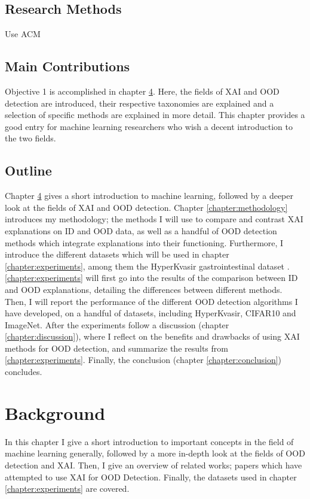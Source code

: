 \documentclass[UKenglish]{uiomasterthesis} %
\theoremstyle{definition}
\begin{document}
\section{Research Methods}

Use ACM


\section{Main Contributions}

Objective 1 is accomplished in chapter \ref{chapter:background}. Here, the fields of XAI and OOD detection are introduced, their respective taxonomies are explained and a selection of specific methods are explained in more detail. This chapter provides a good entry for machine learning researchers who wish a decent introduction to the two fields.

\section{Outline}

Chapter \ref{chapter:background} gives a short introduction to machine learning, followed by a deeper look at the fields of XAI and OOD detection. Chapter \ref{chapter:methodology} introduces my methodology; the methods I will use to compare and contrast XAI explanations on ID and OOD data, as well as a handful of OOD detection methods which integrate explanations into their functioning. Furthermore, I introduce the different datasets which will be used in chapter \ref{chapter:experiments}, among them the HyperKvasir gastrointestinal dataset \cite{hyperkvasir}. \ref{chapter:experiments} will first go into the results of the comparison between ID and OOD explanations, detailing the differences between different methods. Then, I will report the performance of the different OOD detection algorithms I have developed, on a handful of datasets, including HyperKvasir, CIFAR10 and ImageNet. After the experiments follow a discussion (chapter \ref{chapter:discussion}), where I reflect on the benefits and drawbacks of using XAI methods for OOD detection, and summarize the results from \ref{chapter:experiments}. Finally, the conclusion (chapter \ref{chapter:conclusion}) concludes.

\chapter{Background} \label{chapter:background}

In this chapter I give a short introduction to important concepts in the field of machine learning generally, followed by a more in-depth look at the fields of OOD detection and XAI. Then, I give an overview of related works; papers which have attempted to use XAI for OOD Detection. Finally, the datasets used in chapter \ref{chapter:experiments} are covered. 
\end{document}

